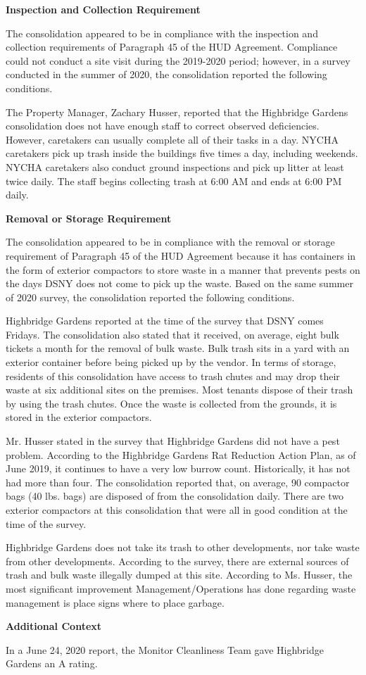  

\textbf{Inspection and Collection Requirement} 

 

The consolidation appeared to be in compliance with the inspection and collection requirements of Paragraph 45 of the HUD Agreement. Compliance could not conduct a site visit during the 2019-2020 period; however, in a survey conducted in the summer of 2020, the consolidation reported the following conditions. 

The Property Manager, Zachary Husser, reported that the Highbridge Gardens consolidation does not have enough staff to correct observed deficiencies. However, caretakers can usually complete all of their tasks in a day. NYCHA caretakers pick up trash inside the buildings five times a day, including weekends. NYCHA caretakers also conduct ground inspections and pick up litter at least twice daily. The staff begins collecting trash at 6:00 AM and ends at 6:00 PM daily. 

\textbf{Removal or Storage Requirement} 

The consolidation appeared to be in compliance with the removal or storage requirement of Paragraph  45 of the HUD Agreement because it has containers in the form of exterior compactors to store waste in a manner that prevents pests on the days DSNY does not come to pick up the waste. Based on the same summer of  2020 survey, the consolidation reported the following conditions.

Highbridge Gardens reported at the time of the survey that DSNY comes Fridays. The consolidation also stated that it received, on average, eight bulk tickets a month for the removal of bulk waste. Bulk trash sits in a yard with an exterior container before being picked up by the vendor. In terms of storage, residents of this consolidation have access to trash chutes and may drop their waste at six additional sites on the premises. Most tenants dispose of their trash by using the trash chutes. Once the waste is collected from the grounds, it is stored in the exterior compactors.  

 

Mr. Husser stated in the survey that Highbridge Gardens did not have a pest problem. According to the Highbridge Gardens Rat Reduction Action Plan, as of June 2019, it continues to have a very low burrow count. Historically, it has not had more than four. The consolidation reported that, on average, 90 compactor bags (40 lbs. bags)  are disposed of from the consolidation daily. There are two exterior compactors at this consolidation that were all in good condition at the time of the survey. 

Highbridge Gardens does not take its trash to other developments, nor take waste from other developments. According to the survey, there are external sources of trash and bulk waste illegally dumped at this site. According to Ms. Husser, the most significant improvement Management/Operations has done regarding waste management is place signs where to place garbage.

\textbf{Additional Context}  

In a June 24, 2020 report, the Monitor Cleanliness Team gave Highbridge Gardens an A rating.  